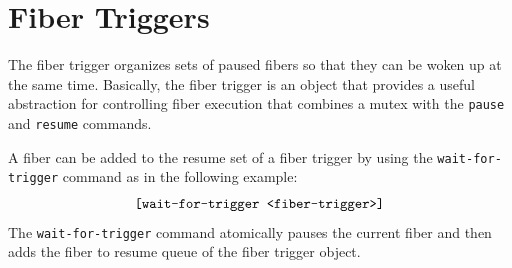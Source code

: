 \section{Fiber Triggers}

The fiber trigger organizes sets of paused fibers so that they can be
woken up at the same time.  Basically, the fiber trigger is an object
that provides a useful abstraction for controlling fiber execution
that combines a mutex with the {\tt pause} and {\tt resume} commands.

A fiber can be added to the resume set of a fiber trigger by using the
{\tt wait-for-trigger} command as in the following example:
\begin{equation*}
\text{\tt [wait-for-trigger <fiber-trigger>]}
\end{equation*}
The {\tt wait-for-trigger} command atomically pauses the current fiber
and then adds the fiber to resume queue of the fiber trigger object.







